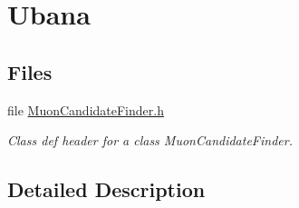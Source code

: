 \hypertarget{group__ubana}{\section{Ubana}
\label{group__ubana}
}
\subsection*{Files}
\begin{DoxyCompactItemize}
\item 
file \hyperlink{MuonCandidateFinder_8h}{Muon\-Candidate\-Finder.\-h}
\begin{DoxyCompactList}\small\item\em Class def header for a class Muon\-Candidate\-Finder. \end{DoxyCompactList}\end{DoxyCompactItemize}


\subsection{Detailed Description}
